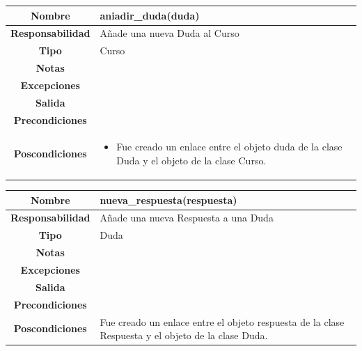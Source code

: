                        \begin{table}[!ht]
\begin{tabular}{|c|m{10cm}|}
\hline\rowcolor{Gray}
{\bf Nombre } & {aniadir\_duda(duda)}\\
\hline
{\bf Responsabilidad } & {Añade una nueva Duda al Curso}\\
\hline
\rowcolor{Gray}
{\bf Tipo } & {Curso} \\
\hline
{\bf Notas } & { } \\
\hline
\rowcolor{Gray}
{\bf Excepciones }& {
} \\
\hline
{\bf Salida }& 
	  { 	
 } 
 \\
\hline
\rowcolor{Gray}
{\bf Precondiciones }& {
}\\
\hline
{\bf Poscondiciones }& {
\begin{itemize}
\item Fue creado un enlace entre el objeto duda de la clase Duda y el objeto de la clase Curso.
\end{itemize}
}
  \\
\hline
\end{tabular}

\end{table}








                       \begin{table}[!ht]
\begin{tabular}{|c|m{10cm}|}
\hline\rowcolor{Gray}
{\bf Nombre } & {nueva\_respuesta(respuesta)}\\
\hline
{\bf Responsabilidad } & {Añade una nueva Respuesta a una Duda}\\
\hline
\rowcolor{Gray}
{\bf Tipo } & {Duda} \\
\hline
{\bf Notas } & { } \\
\hline
\rowcolor{Gray}
{\bf Excepciones }& {
} \\
\hline
{\bf Salida }& 
	  { 	
} 
 \\
\hline
\rowcolor{Gray}
{\bf Precondiciones }& {
}\\
\hline
{\bf Poscondiciones }& { Fue creado un enlace entre el objeto respuesta de la clase Respuesta y el objeto de la clase Duda.
}
  \\
\hline
\end{tabular}

\end{table}






